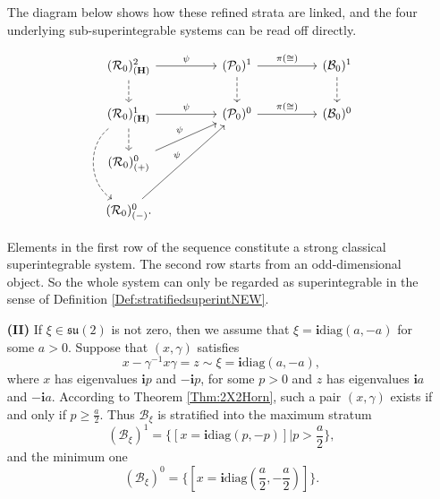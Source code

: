 \documentclass[12pt]{amsart}
\theoremstyle{definition}
\numberwithin{equation}{section}
\def\diag{\mathrm{diag}}
\newcommand{\imagunit}{\mathbf{i}}
\newcommand{\su}{\mathfrak{su}}
\newcommand{\SET}[1]{\{#1\}}
\newcommand{\Bxi}{\mathcal{B}_{\xi}}
\newcommand{\Cartan}{\mathbf{H}}
\newcommand{\Rxizero}{\mathcal{R}_{0}}
\newcommand{\Pxizero}{\mathcal{P}_{0}}
\newcommand{\Bxizero}{\mathcal{B}_{0}}
\begin{document}
\begin{itemize}
The diagram below shows how these refined strata are linked, and the four underlying  sub-superintegrable systems can be read off directly. 

\begin{equation}
	\label{Diagram:SU2arrows00NEW}
	\begin{tikzcd}
		(\Rxizero)^2_{(\Cartan)  }  \arrow[d,dashed] \arrow[rr,"\psi"] && (\Pxizero)^1      \arrow[d,dashed] \arrow[rr ,"\pi(\cong)"]   && (\Bxizero)^1  \arrow[d,dashed]   \\
		(\Rxizero)^1_{(\Cartan)} \arrow[rr,"\psi" ]\arrow[d,dashed] \arrow[dd,bend right=55, dashed] && (\Pxizero)^0    \arrow[rr,"\pi(\cong)" ]  && (\Bxizero)^0  \\ (\Rxizero)^0_{(+)} \arrow[rru,"\psi"] && &&\\
(\Rxizero)^0_{(-)}. \arrow[rruu,"\psi"]&& &&
	\end{tikzcd}
\end{equation}

Elements in the first row of the sequence constitute  a strong classical superintegrable system. The second row starts from an odd-dimensional object. So the whole system can only be regarded as superintegrable in the sense of Definition \ref{Def:stratifiedsuperintNEW}.

 
  \item[\textbf{(II)}]  If $\xi\in \su(2)$ is not zero, then we  assume that $\xi=\imagunit \diag(a,-a)$ for some $a>0$. Suppose that $(x,\gamma)$  satisfies   
      \begin{equation}\label{Eqt:tempSU2}
         x-\gamma^{-1} x\gamma=z \sim \xi=\imagunit \diag(a,-a),
      \end{equation} where $x$ has eigenvalues $\imagunit p$ and $-\imagunit p$, for some $p>0$ and $z$ has eigenvalues $\imagunit a$ and $-\imagunit a$. According to Theorem \ref{Thm:2X2Horn}, such a pair $(x,\gamma)$ exists if and only if $p\geqslant \frac{a}{2}$. Thus  $\Bxi $ is stratified into the maximum stratum
      $$(\Bxi)^1=\SET{[x=\imagunit \diag(p,-p)]|p>\frac{a}{2}},
      $$
      and the minimum one $$(\Bxi)^0=\SET{[x=\imagunit \diag(\frac{a}{2},-\frac{a}{2})] }.
      $$ 
      

\end{itemize}
\end{document}
